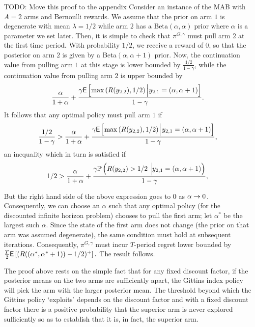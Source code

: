 \begin{myproof}[Proof.]
{\color{red} TODO: Move this proof to the appendix}
Consider an instance of the MAB with $A=2$ arms and Bernoulli rewards. We assume that the prior on arm $1$ is degenerate with mean $\lambda = 1/2$ while arm $2$ has a {\rm Beta}$(\alpha,\alpha)$ prior where $\alpha$ is a parameter we set later. Then, it is simple to check that $\pi^{G,\gamma}$ must pull arm $2$ at the first time period. With probability $1/2$, we receive a reward of $0$, so that the posterior on arm $2$ is given by a {\rm Beta}$(\alpha,\alpha+1)$ prior. Now, the continuation value from pulling arm $1$ at this stage is lower bounded by $\frac{1/2}{1-\gamma}$, while the continuation value from pulling arm $2$ is upper bounded by
\[
\frac{\alpha}{1+\alpha}
+
\frac{
\gamma
\E
\left[
\max\left(
R(y_{2,2}),1/2
\right)
\Big| y_{2,1} = \left(\alpha, \alpha+1 \right)
\right]
}
{
1-\gamma
}.
\]
It follows that any optimal policy must pull arm $1$ if
\[
\frac{1/2}{1-\gamma}
>
\frac{\alpha}{1+\alpha}
+
\frac{
\gamma
\E
\left[
\max\left(
R(y_{2,2}),1/2
\right)
\Big| y_{2,1} = \left(\alpha, \alpha+1 \right)
\right]
}
{
1-\gamma
},
\]
an inequality which in turn is satisfied if
\[
1/2
>
\frac{\alpha}{1+\alpha}
+
\frac{
\gamma
\P{
R(y_{2,2})>1/2 \
\Big| y_{2,1} = \left(\alpha, \alpha+1 \right)
}
}
{
1-\gamma
},
\]

But the right hand side of the above expression goes to $0$ as $\alpha \tends 0$. Consequently, we can choose an $\alpha$ such that any optimal policy (for the discounted infinite horizon problem) chooses to pull the first arm; let $\alpha^*$ be the largest such $\alpha$. Since the state of the first arm does not change (the prior on that arm was assumed degenerate), the same condition must hold at subsequent iterations. Consequently, $\pi^{G,\gamma}$ must incur $T$-period regret lower bounded by 
$\frac{T}{2}
\E
\left[
(
R((\alpha^*,\alpha^*+1)) - 1/2
)^+
\right].
$
The result follows. 
\end{myproof}
The proof above rests on the simple fact that for any fixed discount factor, if the posterior means on the two arms are sufficiently apart, the Gittins index policy will pick the arm with the larger posterior mean. The threshold beyond which the Gittins policy `exploits' depends on the discount factor and with a fixed discount factor there is a positive probability that the superior arm is never explored sufficiently so as to establish that it is, in fact, the superior arm. 

